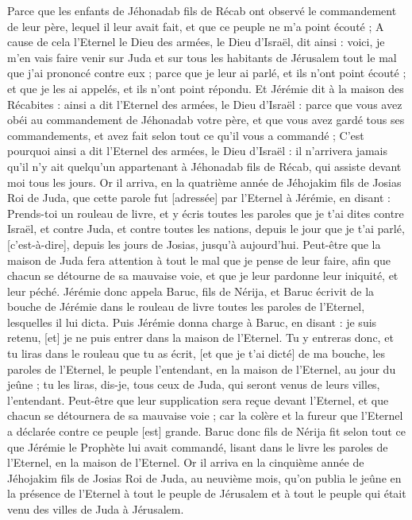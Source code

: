 \begin{multicols}{2}
Parce que les enfants de Jéhonadab fils de Récab ont observé le commandement de leur père, lequel il leur avait fait, et que ce peuple ne m'a point écouté ;
A cause de cela l'Eternel le Dieu des armées, le Dieu d'Israël, dit ainsi : voici, je m'en vais faire venir sur Juda et sur tous les habitants de Jérusalem tout le mal que j'ai prononcé contre eux ; parce que je leur ai parlé, et ils n'ont point écouté ; et que je les ai appelés, et ils n'ont point répondu.
Et Jérémie dit à la maison des Récabites : ainsi a dit l'Eternel des armées, le Dieu d'Israël : parce que vous avez obéi au commandement de Jéhonadab votre père, et que vous avez gardé tous ses commandements, et avez fait selon tout ce qu'il vous a commandé ;
C'est pourquoi ainsi a dit l'Eternel des armées, le Dieu d'Israël : il n'arrivera jamais qu'il n'y ait quelqu'un appartenant à Jéhonadab fils de Récab, qui assiste devant moi tous les jours.
\VerseOne{}Or il arriva, en la quatrième année de Jéhojakim fils de Josias Roi de Juda, que cette parole fut [adressée] par l'Eternel à Jérémie, en disant :
Prends-toi un rouleau de livre, et y écris toutes les paroles que je t'ai dites contre Israël, et contre Juda, et contre toutes les nations, depuis le jour que je t'ai parlé, [c'est-à-dire], depuis les jours de Josias, jusqu’à aujourd'hui.
Peut-être que la maison de Juda fera attention à tout le mal que je pense de leur faire, afin que chacun se détourne de sa mauvaise voie, et que je leur pardonne leur iniquité, et leur péché.
Jérémie donc appela Baruc, fils de Nérija, et Baruc écrivit de la bouche de Jérémie dans le rouleau de livre toutes les paroles de l'Eternel, lesquelles il lui dicta.
Puis Jérémie donna charge à Baruc, en disant : je suis retenu, [et] je ne puis entrer dans la maison de l'Eternel.
Tu y entreras donc, et tu liras dans le rouleau que tu as écrit, [et que je t'ai dicté] de ma bouche, les paroles de l'Eternel, le peuple l'entendant, en la maison de l'Eternel, au jour du jeûne ; tu les liras, dis-je, tous ceux de Juda, qui seront venus de leurs villes, l'entendant.
Peut-être que leur supplication sera reçue devant l'Eternel, et que chacun se détournera de sa mauvaise voie ; car la colère et la fureur que l'Eternel a déclarée contre ce peuple [est] grande.
Baruc donc fils de Nérija fit selon tout ce que Jérémie le Prophète lui avait commandé, lisant dans le livre les paroles de l'Eternel, en la maison de l'Eternel.
Or il arriva en la cinquième année de Jéhojakim fils de Josias Roi de Juda, au neuvième mois, qu'on publia le jeûne en la présence de l'Eternel à tout le peuple de Jérusalem et à tout le peuple qui était venu des villes de Juda à Jérusalem.

\end{multicols}
